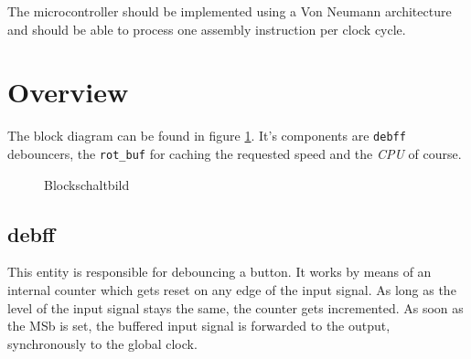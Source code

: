 \documentclass[a4paper,10pt]{scrartcl}
\begin{document}
The microcontroller should be implemented using a Von Neumann architecture and should be able to process one assembly instruction per clock cycle. 


\section{Overview}
\label{sec:block}

The block diagram can be found in figure \ref{fig:block}. It's
components are \texttt{debff} debouncers, the \texttt{rot\_buf} for
caching the requested speed and the \emph{CPU} of course.


\begin{figure}[ht]
	\centering
\noindent{}
	\caption{Blockschaltbild}
	\label{fig:block}
\end{figure}

\subsection{debff}
\label{sec:debff}

This entity is responsible for debouncing a button. It works by means
of an internal counter which gets reset on any edge of the input
signal. As long as the level of the input signal stays the same, the
counter gets incremented. As soon as the MSb is set, the buffered
input signal is forwarded to the output, synchronously to the global
clock.
\end{document}
